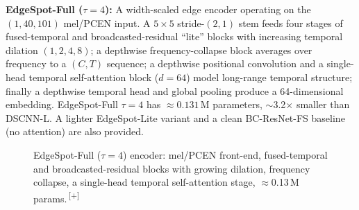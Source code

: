 \documentclass[12pt,a4paper]{report}
\newcommand{\NEW}[1]{{\color{addcolor}#1\,\textsuperscript{\tiny[+]}}}
\newcommand{\NEW}[1]{#1}
\begin{document}
\textbf{EdgeSpot-Full ($\tau{=}4$):} A width-scaled edge encoder operating on the
$(1,40,101)$ mel/PCEN input. A $5{\times}5$ stride-$(2,1)$ stem feeds four stages
of fused-temporal and broadcasted-residual ``lite'' blocks with increasing
temporal dilation $(1,2,4,8)$; a depthwise frequency-collapse block averages over
frequency to a $(C,T)$ sequence; a depthwise positional convolution and a
single-head temporal self-attention block ($d = 64$) model long-range temporal
structure; finally a depthwise temporal head and global pooling produce a
64-dimensional embedding. EdgeSpot-Full $\tau{=}4$ has $\approx 0.131$\,M
parameters, $\sim$3.2$\times$ smaller than DSCNN-L. A lighter EdgeSpot-Lite
variant and a clean BC-ResNet-FS baseline (no attention) are also provided.

\begin{figure}[H]
\centering
{}
\caption{\NEW{EdgeSpot-Full ($\tau{=}4$) encoder: mel/PCEN front-end, fused-temporal
and broadcasted-residual blocks with growing dilation, frequency collapse, a
single-head temporal self-attention stage, $\approx$0.13\,M params.}}
\label{fig:edgespot}
\end{figure}
\end{document}
